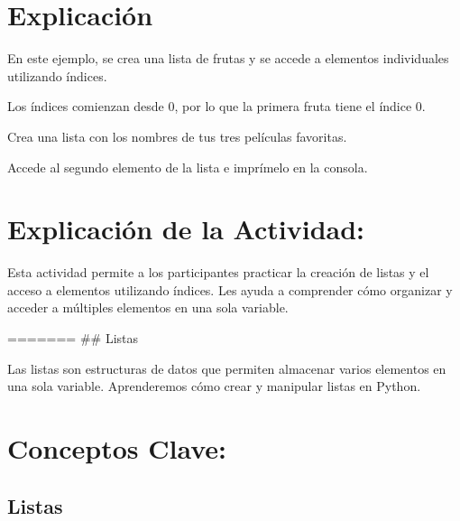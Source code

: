\documentclass[
  a4paper,
  DIV=11,
  numbers=noendperiod,
  onepage,
  openany]{scrreprt}
\begin{document}
\hypertarget{explicaciuxf3n-18}{%
\section{Explicación}\label{explicaciuxf3n-18}}

En este ejemplo, se crea una lista de frutas y se accede a elementos
individuales utilizando índices.

Los índices comienzan desde 0, por lo que la primera fruta tiene el
índice 0.

\begin{tcolorbox}[enhanced jigsaw, colbacktitle=quarto-callout-important-color!10!white, toprule=.15mm, leftrule=.75mm, titlerule=0mm, opacityback=0, rightrule=.15mm, opacitybacktitle=0.6, breakable, left=2mm, coltitle=black, title=\textcolor{quarto-callout-important-color}{\faExclamation}\hspace{0.5em}{Actividad Práctica:}, toptitle=1mm, bottomtitle=1mm, arc=.35mm, bottomrule=.15mm, colback=white, colframe=quarto-callout-important-color-frame]

Crea una lista con los nombres de tus tres películas favoritas.

Accede al segundo elemento de la lista e imprímelo en la consola.

\end{tcolorbox}

\hypertarget{explicaciuxf3n-de-la-actividad-16}{%
\section{Explicación de la
Actividad:}\label{explicaciuxf3n-de-la-actividad-16}}

Esta actividad permite a los participantes practicar la creación de
listas y el acceso a elementos utilizando índices. Les ayuda a
comprender cómo organizar y acceder a múltiples elementos en una sola
variable.

======= \#\# Listas

Las listas son estructuras de datos que permiten almacenar varios
elementos en una sola variable. Aprenderemos cómo crear y manipular
listas en Python.

\hypertarget{conceptos-clave-19}{%
\section{Conceptos Clave:}\label{conceptos-clave-19}}

\hypertarget{listas-2}{%
\subsection{Listas}\label{listas-2}}
\end{document}
